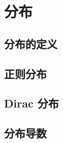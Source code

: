 \section{分布}
\label{b1:sec:2002}


\subsection{分布的定义}
\label{b1:subsec:200201}

\subsection{正则分布}
\label{b1:subsec:200202}

\subsection{Dirac 分布}
\label{b1:subsec:200203}

\subsection{分布导数}
\label{b1:subsec:200204}


